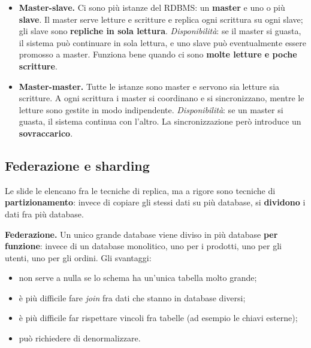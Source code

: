 \begin{itemize}
  \item \textbf{Master-slave.} Ci sono più istanze del RDBMS: un \textbf{master} e uno o più \textbf{slave}. Il master serve
        letture e scritture e replica ogni scrittura su ogni slave; gli slave sono \textbf{repliche in sola lettura}.
        \textit{Disponibilità}: se il master si guasta, il sistema può continuare in sola lettura, e uno slave può
        eventualmente essere promosso a master. Funziona bene quando ci sono \textbf{molte letture e poche scritture}.
  \item \textbf{Master-master.} Tutte le istanze sono master e servono sia letture sia scritture. A ogni scrittura i master
        si coordinano e si sincronizzano, mentre le letture sono gestite in modo indipendente. \textit{Disponibilità}: se un
        master si guasta, il sistema continua con l'altro. La sincronizzazione però introduce un \textbf{sovraccarico}.
\end{itemize}

\subsection{Federazione e sharding}

Le slide le elencano fra le tecniche di replica, ma a rigore sono tecniche di \textbf{partizionamento}: invece di copiare
gli stessi dati su più database, si \textbf{dividono} i dati fra più database.

\noindent\begin{minipage}[c]{0.56\textwidth}
\textbf{Federazione.} Un unico grande database viene diviso in più database \textbf{per funzione}: invece di un database
monolitico, uno per i prodotti, uno per gli utenti, uno per gli ordini. Gli svantaggi:
\begin{itemize}
  \item non serve a nulla se lo schema ha un'unica tabella molto grande;
  \item è più difficile fare \textit{join} fra dati che stanno in database diversi;
  \item è più difficile far rispettare vincoli fra tabelle (ad esempio le chiavi esterne);
  \item può richiedere di denormalizzare.
\end{itemize}
\end{minipage}\hfill
\begin{minipage}[c]{0.4\textwidth}
\centering
{}
\end{minipage}

